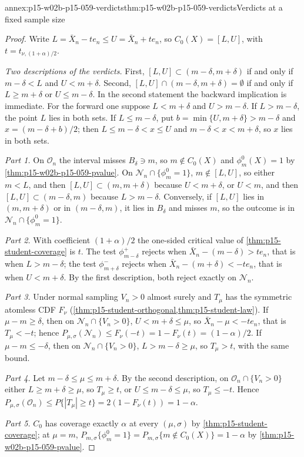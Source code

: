 \begin{annexitem}{annex:p15-w02b-p15-059-verdicts}{thm:p15-w02b-p15-059-verdicts}{Verdicts at a fixed sample size}
\begin{proof}
Write \(L=\bar X_n-te_n\leq U=\bar X_n+te_n\), so \(C_0(X)=[L,U]\), with
\(t=t_{\nu,(1+\alpha)/2}\).

\emph{Two descriptions of the verdicts.} First, \([L,U]\subset
(m-\delta,m+\delta)\) if and only if \(m-\delta<L\) and \(U<m+\delta\).
Second, \([L,U]\cap(m-\delta,m+\delta)=\emptyset\) if and only if
\(L\geq m+\delta\) or \(U\leq m-\delta\). In the second statement the
backward implication is immediate. For the forward one suppose
\(L<m+\delta\) and \(U>m-\delta\). If \(L>m-\delta\), the point \(L\)
lies in both sets. If \(L\leq m-\delta\), put
\(b=\min\{U,m+\delta\}>m-\delta\) and \(x=(m-\delta+b)/2\); then
\(L\leq m-\delta<x\leq U\) and \(m-\delta<x<m+\delta\), so \(x\) lies in
both sets.

\emph{Part 1.} On \(\mathcal O_n\) the interval misses
\(B_\delta\ni m\), so \(m\notin C_0(X)\) and \(\phi_m^0(X)=1\) by
\cref{thm:p15-w02b-p15-059-pvalue}. On \(\mathcal N_n\cap\{\phi_m^0=1\}\),
\(m\notin[L,U]\), so either \(m<L\), and then \([L,U]\subset(m,m+\delta)\)
because \(U<m+\delta\), or \(U<m\), and then \([L,U]\subset(m-\delta,m)\)
because \(L>m-\delta\). Conversely, if \([L,U]\) lies in
\((m,m+\delta)\) or in \((m-\delta,m)\), it lies in \(B_\delta\) and
misses \(m\), so the outcome is in \(\mathcal N_n\cap\{\phi_m^0=1\}\).

\emph{Part 2.} With coefficient \((1+\alpha)/2\) the one-sided critical
value of \cref{thm:p15-student-coverage} is \(t\). The test
\(\phi_{m-\delta}^+\) rejects when \(\bar X_n-(m-\delta)>te_n\), that is
when \(L>m-\delta\); the test \(\phi_{m+\delta}^-\) rejects when
\(\bar X_n-(m+\delta)<-te_n\), that is when \(U<m+\delta\). By the first
description, both reject exactly on \(\mathcal N_n\).

\emph{Part 3.} Under normal sampling \(V_n>0\) almost surely and
\(T_\mu\) has the symmetric atomless CDF \(F_\nu\)
(\cref{thm:p15-student-orthogonal,thm:p15-student-law}). If
\(\mu-m\geq\delta\), then on \(\mathcal N_n\cap\{V_n>0\}\),
\(U<m+\delta\leq\mu\), so \(\bar X_n-\mu<-te_n\), that is \(T_\mu<-t\);
hence \(P_{\mu,\sigma}(\mathcal N_n)\leq F_\nu(-t)=1-F_\nu(t)=(1-\alpha)/2\).
If \(\mu-m\leq-\delta\), then on \(\mathcal N_n\cap\{V_n>0\}\),
\(L>m-\delta\geq\mu\), so \(T_\mu>t\), with the same bound.

\emph{Part 4.} Let \(m-\delta\leq\mu\leq m+\delta\). By the second
description, on \(\mathcal O_n\cap\{V_n>0\}\) either
\(L\geq m+\delta\geq\mu\), so \(T_\mu\geq t\), or
\(U\leq m-\delta\leq\mu\), so \(T_\mu\leq-t\). Hence
\(P_{\mu,\sigma}(\mathcal O_n)\leq P\{|T_\mu|\geq t\}=2(1-F_\nu(t))=1-\alpha\).

\emph{Part 5.} \(C_0\) has coverage exactly \(\alpha\) at every
\((\mu,\sigma)\) by \cref{thm:p15-student-coverage}; at \(\mu=m\),
\(P_{m,\sigma}\{\phi_m^0=1\}=P_{m,\sigma}\{m\notin C_0(X)\}=1-\alpha\) by
\cref{thm:p15-w02b-p15-059-pvalue}.
\end{proof}
\end{annexitem}


